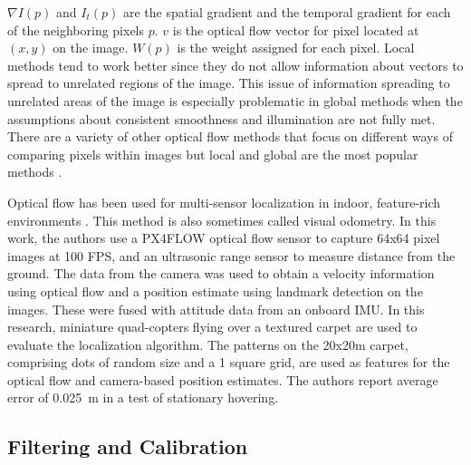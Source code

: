 \documentclass{article}
\begin{document}
    $\nabla I(p)$ and $I_t(p)$ are the spatial gradient and the temporal gradient for each of the neighboring pixels $p$. $v$ is the optical flow vector for pixel located at $(x, y)$ on the image. $W(p)$ is the weight assigned for each pixel. Local methods tend to work better since they do not allow information about vectors to spread to unrelated regions of the image. This issue of information spreading to unrelated areas of the image is especially problematic in global methods when the assumptions about consistent smoothness and illumination are not fully met. There are a variety of other optical flow methods that focus on different ways of comparing pixels within images but local and global are the most popular methods \cite{odonovan_optical_2005}.

    Optical flow has been used for multi-sensor localization in indoor, feature-rich environments \cite{gao_qingji_onboard_2015}. This method is also sometimes called visual odometry. In this work, the authors use a PX4FLOW optical flow sensor to capture 64x64 pixel images at 100 FPS, and an ultrasonic range sensor to measure distance from the ground. The data from the camera was used to obtain a velocity information using optical flow and a position estimate using landmark detection on the images. These were fused with attitude data from an onboard IMU. In this research, miniature quad-copters flying over a textured carpet are used to evaluate the localization algorithm. The patterns on the 20x20m carpet, comprising dots of random size and a 1 square grid, are used as features for the optical flow and camera-based position estimates. The authors report average error of \SI{0.025}{\meter} in a test of stationary hovering.

  \subsection{Filtering and Calibration} \label{filtering}
\end{document}
